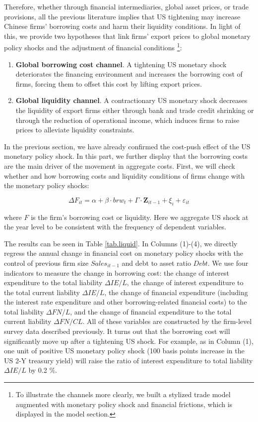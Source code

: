 Therefore, whether through financial intermediaries, global asset prices, or trade provisions, all the previous literature implies that US tightening may increase Chinese firms' borrowing costs and harm their liquidity conditions. In light of this, we provide two hypotheses that link firms' export prices to global monetary policy shocks and the adjustment of financial conditions \footnote{To illustrate the channels more clearly, we built a stylized trade model augmented with monetary policy shock and financial frictions, which is displayed in the model section.}:

\begin{enumerate}
    \item \textbf{Global borrowing cost channel}. A tightening US monetary shock deteriorates the financing environment and increases the borrowing cost of firms, forcing them to offset this cost by lifting export prices.
    \item \textbf{Global liquidity channel}. A contractionary US monetary shock decreases the liquidity of export firms either through bank and trade credit shrinking or through the reduction of operational income, which induces firms to raise prices to alleviate liquidity constraints.
\end{enumerate}

In the previous section, we have already confirmed the cost-push effect of the US monetary policy shock. In this part, we further display that the borrowing costs are the main driver of the movement in aggregate costs. First, we will check whether and how borrowing costs and liquidity conditions of firms change with the monetary policy shocks:

\begin{equation}
    \Delta F_{it} = \alpha +\beta \cdot brw_{t}+ \Gamma \cdot \textbf{Z}_{it-1}+\xi_{i}+\varepsilon_{it} \label{reg.liquid}
\end{equation}

where $F$ is the firm's borrowing cost or liquidity. Here we aggregate US shock at the year level to be consistent with the frequency of dependent variables.

The results can be seen in Table \ref{tab.liquid}. In Columns (1)-(4), we directly regress the annual change in financial cost on monetary policy shocks with the control of previous firm size $Sales_{it-1}$ and debt to asset ratio $Debt$. We use four indicators to measure the change in borrowing cost: the change of interest expenditure to the total liability $\Delta IE/L$, the change of interest expenditure to the total current liability $\Delta IE/L$, the change of financial expenditure (including the interest rate expenditure and other borrowing-related financial costs) to the total liability $\Delta FN/L$, and the change of financial expenditure to the total current liability $\Delta FN/CL$. All of these variables are constructed by the firm-level survey data described previously. It turns out that the borrowing cost will significantly move up after a tightening US shock. For example, as in Column (1), one unit of positive US monetary policy shock (100 basis points increase in the US 2-Y treasury yield) will raise the ratio of interest expenditure to total liability $\Delta IE/L$ by 0.2 $\%$. 

